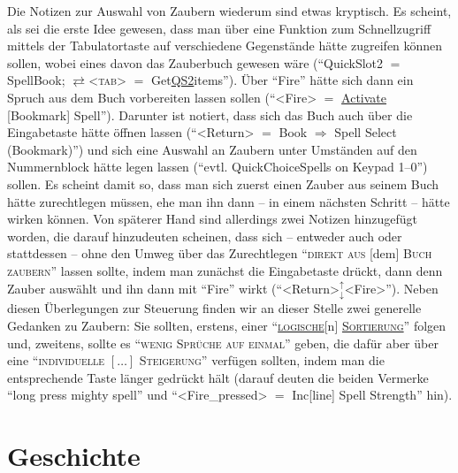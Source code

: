 \documentclass[a5paper,pagesize]{scrbook}
\begin{document}
Die Notizen zur Auswahl von Zaubern wiederum sind etwas kryptisch.
Es scheint, als sei die erste Idee gewesen, dass man über eine Funktion zum Schnellzugriff mittels der Tabulatortaste auf verschiedene Gegenstände hätte zugreifen können sollen, wobei eines davon das Zauberbuch gewesen wäre (\enquote{QuickSlot2 $=$ SpellBook; $\rightleftarrows$<\textsc{tab}> $=$ Get\uline{QS2}items}).
Über \enquote{Fire} hätte sich dann ein Spruch aus dem Buch vorbereiten lassen sollen (\enquote{<Fire> $=$ \uline{Activate} [Bookmark] Spell}).
Darunter ist notiert, dass sich das Buch auch über die Eingabetaste hätte öffnen lassen (\enquote{<Return> $=$ Book $\Rightarrow$ Spell Select (Bookmark)}) und sich eine Auswahl an Zaubern unter Umständen auf den Nummernblock hätte legen lassen (\enquote{evtl. QuickChoiceSpells on Keypad 1--0}) sollen.
Es scheint damit so, dass man sich zuerst einen Zauber aus seinem Buch hätte zurechtlegen müssen, ehe man ihn dann -- in einem nächsten Schritt -- hätte wirken können.
Von späterer Hand sind allerdings zwei Notizen hinzugefügt worden, die darauf hinzudeuten scheinen, dass sich -- entweder auch oder stattdessen -- ohne den Umweg über das Zurechtlegen \enquote{\textsc{direkt aus} [dem] \textsc{Buch zaubern}} lassen sollte, indem man zunächst die Eingabetaste drückt, dann denn Zauber auswählt und ihn dann mit \enquote{Fire} wirkt (\enquote{<Return>$_{\downarrow}^{\uparrow}$<Fire>}).
Neben diesen Überlegungen zur Steuerung finden wir an dieser Stelle zwei generelle Gedanken zu Zaubern:
Sie sollten, erstens, einer \enquote{\textsc{\uline{logische}}[n] \textsc{\uline{Sortierung}}} folgen und, zweitens, sollte es \enquote{\textsc{wenig Sprüche auf einmal}} geben, die dafür aber über eine \enquote{\textsc{individuelle $[\dots]$ Steigerung}} verfügen sollten, indem man die entsprechende Taste länger gedrückt hält (darauf deuten die beiden Vermerke \enquote{long press mighty spell} und \enquote{<Fire\_pressed> $=$ Inc[line] Spell Strength} hin).\autocite[S.~3]{orpheus_interface}


\section{Geschichte}\label{sec:orpheus_geschichte}


\clearpage
\appendix


\clearpage
\printbibliography
\end{document}
